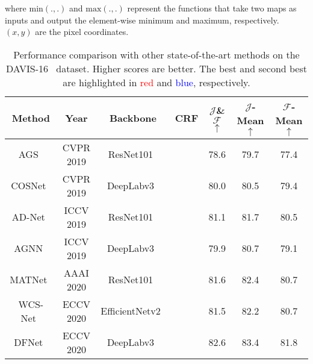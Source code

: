 \documentclass[10pt,twocolumn,letterpaper]{article}
\begin{document}
\noindent
where $\textrm{min} \left (.,. \right )$ and $\textrm{max} \left (.,. \right )$ represent the functions that take two maps as inputs and output the element-wise minimum and maximum, respectively. $\left( x,y \right)$ are the pixel coordinates.

\begin{table*}[t]
	\begin{center}
		\caption{Performance comparison with other state-of-the-art methods on the DAVIS-16~\cite{perazzi2016benchmark} dataset. Higher scores are better. The best and second best are highlighted in \textcolor{red}{red} and \textcolor{blue}{blue}, respectively.
	}
		\label{table:tb1}
		\begin{tabular}{c|c|c|P{1.5cm}|ccc}
			\hline
			Method       & Year                  & Backbone       & CRF                   & $\mathcal{J}$\&$\mathcal{F}$ $\uparrow$                & $\mathcal{J}$-Mean $\uparrow$              & $\mathcal{F}$-Mean $\uparrow$              \\ \hline
			AGS~\cite{wang2019learning}          & CVPR 2019             & ResNet101~\cite{he2016deep}      &                   & 78.6                 & 79.7                 & 77.4                 \\
			COSNet~\cite{lu2019see}       & CVPR 2019             & DeepLabv3~\cite{chen2017rethinking}  &                   & 80.0                 & 80.5                 & 79.4                 \\
			AD-Net~\cite{yang2019anchor}       & ICCV 2019             & ResNet101~\cite{he2016deep}      &                       & 81.1                 & 81.7                 & 80.5                 \\
			AGNN~\cite{wang2019zero}         & ICCV 2019             & DeepLabv3~\cite{chen2017rethinking}      &                   & 79.9                 & 80.7                 & 79.1                 \\
			MATNet~\cite{zhou2020motion}       & AAAI 2020             & ResNet101~\cite{he2016deep}      &                       & 81.6                 & 82.4                 & 80.7                 \\
			WCS-Net~\cite{zhang2020unsupervised}      & ECCV 2020             & EfficientNetv2~\cite{tan2021efficientnetv2} &                   & 81.5                 & 82.2                 & 80.7                 \\
			DFNet~\cite{zhen2020learning}        & ECCV 2020             & DeepLabv3~\cite{chen2017rethinking}      &                   & 82.6                 & 83.4                 & 81.8                 \\

\end{tabular}
\end{center}
\end{table*}
\end{document}
